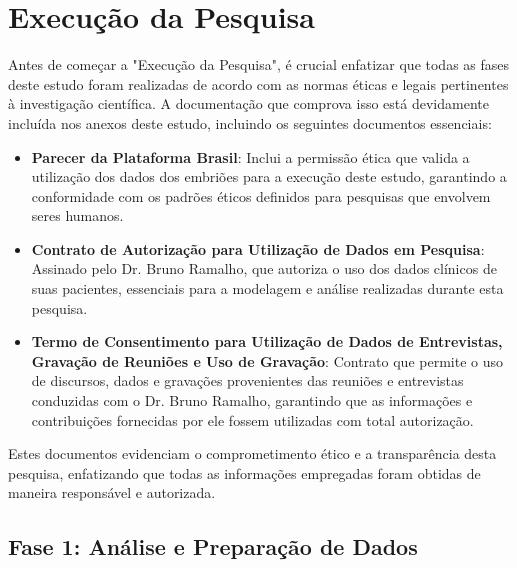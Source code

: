 
\chapter[Execução da Pesquisa]{Execução da Pesquisa}

Antes de começar a "Execução da Pesquisa", é crucial enfatizar que todas as fases deste estudo foram realizadas de acordo com as normas éticas e legais pertinentes à investigação científica. A documentação que comprova isso está devidamente incluída nos anexos deste estudo, incluindo os seguintes documentos essenciais:
\begin{itemize}
  \item \textbf{Parecer da Plataforma Brasil}: Inclui a permissão ética que valida a utilização dos dados dos embriões para a execução deste estudo, garantindo a conformidade com os padrões éticos definidos para pesquisas que envolvem seres humanos.
  \item \textbf{Contrato de Autorização para Utilização de Dados em Pesquisa}: Assinado pelo Dr. Bruno Ramalho, que autoriza o uso dos dados clínicos de suas pacientes, essenciais para a modelagem e análise realizadas durante esta pesquisa.
  \item \textbf{Termo de Consentimento para Utilização de Dados de Entrevistas, Gravação de Reuniões e Uso de Gravação}: Contrato que permite o uso de discursos, dados e gravações provenientes das reuniões e entrevistas conduzidas com o Dr. Bruno Ramalho, garantindo que as informações e contribuições fornecidas por ele fossem utilizadas com total autorização.
\end{itemize}
Estes documentos evidenciam o comprometimento ético e a transparência desta pesquisa, enfatizando que todas as informações empregadas foram obtidas de maneira responsável e autorizada. 

\section{Fase 1: Análise e Preparação de Dados}
